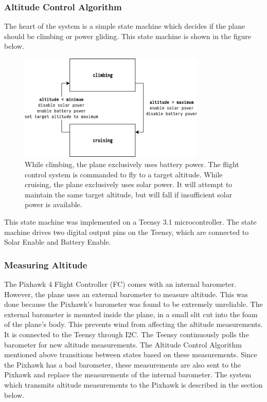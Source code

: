 \documentclass[12pt,journal,compsoc]{IEEEtran}
\begin{document}
\subsubsection{Altitude Control Algorithm}
The heart of the system is a simple state machine which decides if the plane should be climbing or power gliding. This state machine is shown in the figure below. 

\begin{figure}[h!]
\hspace*{0cm}
\centering
\includegraphics[width=3.5in]{altitude_state_machine.png}
\caption{While climbing, the plane exclusively uses battery power. The flight control system is commanded to fly to a target altitude. While cruising, the plane exclusively uses solar power. It will attempt to maintain the same target altitude, but will fall if insufficient solar power is available.}
\label{altitude_state_machine}
\end{figure}

This state machine was implemented on a Teensy 3.1 microcontroller. The state machine drives two digital output pins on the Teensy, which are connected to Solar Enable and Battery Enable. 

\subsubsection{Measuring Altitude}
The Pixhawk 4 Flight Controller (FC) comes with an internal barometer. However, the plane uses an external barometer to measure altitude. This was done because the Pixhawk's barometer was found to be extremely unreliable. The external barometer is mounted inside the plane, in a small slit cut into the foam of the plane's body. This prevents wind from affecting the altitude measurements. It is connected to the Teensy through I2C. The Teensy continuously polls the barometer for new altitude measurements. The Altitude Control Algorithm mentioned above transitions between states based on these measurements. Since the Pixhawk has a bad barometer, these measurements are also sent to the Pixhawk and replace the measurements of the internal barometer. The system which transmits altitude measurements to the Pixhawk is described in the section below.
\end{document}
